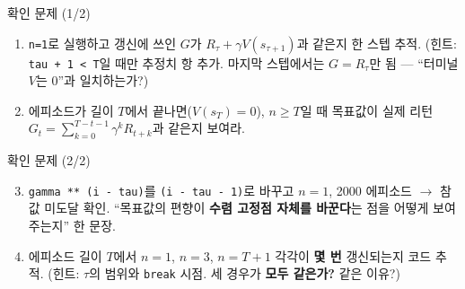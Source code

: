 \documentclass[aspectratio=169,11pt]{beamer}
\begin{document}

\begin{frame}{확인 문제 (1/2)}
  \begin{enumerate}
    \item {} \texttt{n=1}로
      실행하고 갱신에 쓰인 $G$가
      $R_\tau + \gamma V(s_{\tau+1})$과 같은지 한 스텝 추적.
      (힌트: \texttt{tau + 1 < T}일 때만 추정치 항 추가. 마지막
      스텝에서는 $G = R_\tau$만 됨 --- ``터미널 $V$는 0''과 일치하는가?)
    \item {} 에피소드가 길이 $T$에서
      끝나면($V(s_T)=0$), $n \ge T$일 때 목표값이 실제 리턴
      $G_t = \sum_{k=0}^{T-t-1} \gamma^k R_{t+k}$과 같은지 보여라.
  \end{enumerate}
\end{frame}

\begin{frame}{확인 문제 (2/2)}
  \begin{enumerate}
    \setcounter{enumi}{2}
    \item {} \texttt{gamma ** (i - tau)}를
      \texttt{(i - tau - 1)}로 바꾸고 $n=1$, 2000 에피소드 $\to$ 참값
      미도달 확인. ``목표값의 편향이 \textbf{수렴 고정점 자체를
      바꾼다}는 점을 어떻게 보여주는지'' 한 문장.
    \item {} 에피소드 길이 $T$에서
      $n=1$, $n=3$, $n=T+1$ 각각이 \textbf{몇 번} 갱신되는지 코드
      추적. (힌트: $\tau$의 범위와 \texttt{break} 시점. 세 경우가
      \textbf{모두 같은가?} 같은 이유?)
  \end{enumerate}
\end{frame}
\end{document}
